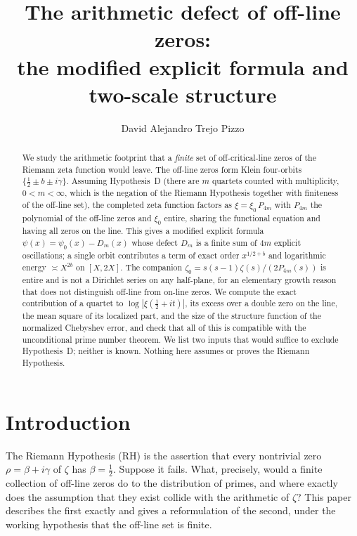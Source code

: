 \documentclass[11pt]{amsart}
\title[The Defect of Off-Line Zeros]{The arithmetic defect of off-line zeros:\\
the modified explicit formula and two-scale structure}
\author{David Alejandro Trejo Pizzo}
\theoremstyle{definition}
\theoremstyle{remark}
\newcommand{\RH}{\mathrm{RH}}
\newcommand{\half}{\tfrac12}
\begin{document}
\begin{abstract}
We study the arithmetic footprint that a \emph{finite} set of off-critical-line zeros of the
Riemann zeta function would leave. The off-line zeros form Klein four-orbits
$\{\half\pm b\pm i\gamma\}$. Assuming Hypothesis~D (there are $m$ quartets counted with
multiplicity, $0<m<\infty$, which is the negation of the Riemann Hypothesis
together with finiteness of the off-line set), the completed zeta function factors as
$\xi=\xi_0\,P_{4m}$ with $P_{4m}$ the polynomial of the off-line zeros and $\xi_0$ entire,
sharing the functional equation and having all zeros on the line. This gives a modified
explicit formula $\psi(x)=\psi_0(x)-D_m(x)$ whose defect $D_m$ is a finite sum of $4m$ explicit
oscillations; a single orbit contributes a term of exact order $x^{1/2+b}$ and logarithmic
energy $\asymp X^{2b}$ on $[X,2X]$. The companion $\zeta_0=s(s-1)\zeta(s)/(2P_{4m}(s))$ is
entire and is not a Dirichlet series on any half-plane, for an elementary growth reason that
does not distinguish off-line from on-line zeros. We compute the exact contribution of a
quartet to $\log|\xi(\half+it)|$, its excess over a double zero on the line, the mean square of
its localized part, and the size of the structure function of the normalized Chebyshev error, and
check that all of this is compatible with the unconditional prime number theorem. We list two
inputs that would suffice to exclude Hypothesis~D; neither is known. Nothing here assumes or
proves the Riemann Hypothesis.
\end{abstract}
\maketitle

\tableofcontents
\newpage

\section{Introduction}

The Riemann Hypothesis ($\RH$) is the assertion that every nontrivial zero
$\rho=\beta+i\gamma$ of $\zeta$ has $\beta=\half$. Suppose it fails. What, precisely, would a
finite collection of off-line zeros do to the distribution of primes, and where exactly does
the assumption that they exist collide with the arithmetic of $\zeta$? This paper describes the
first exactly and gives a reformulation of the second, under the working hypothesis that the
off-line set is finite.
\end{document}
